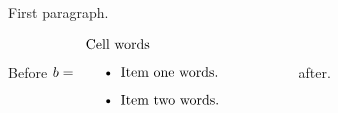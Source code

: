 \documentclass{article}
\begin{document}
First paragraph.

Before $b = \mbox{\begin{tabular}{p{5cm}}Cell words
\begin{itemize}
\item Item one words.
\item Item two words. \lxmbf
\end{itemize}
\end{tabular}}$ after.
\end{document}
